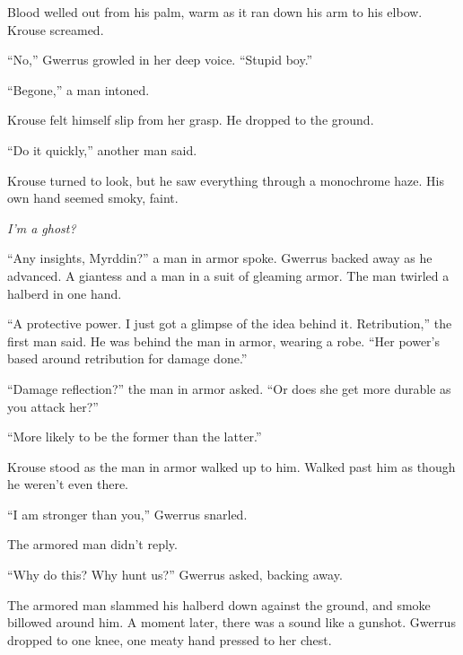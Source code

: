 Blood welled out from his palm, warm as it ran down his arm to his elbow.  Krouse screamed.



``No,'' Gwerrus growled in her deep voice.  ``Stupid boy.''



``Begone,'' a man intoned.



Krouse felt himself slip from her grasp.  He dropped to the ground.



``Do it quickly,'' another man said.



Krouse turned to look, but he saw everything through a monochrome haze.  His own hand seemed smoky, faint.



\emph{I'm a ghost?}



``Any insights, Myrddin?'' a man in armor spoke.  Gwerrus backed away as he advanced.  A giantess and a man in a suit of gleaming armor.  The man twirled a halberd in one hand.



``A protective power.  I just got a glimpse of the idea behind it.  Retribution,'' the first man said.  He was behind the man in armor, wearing a robe.  ``Her power's based around retribution for damage done.''



``Damage reflection?'' the man in armor asked.  ``Or does she get more durable as you attack her?''



``More likely to be the former than the latter.''



Krouse stood as the man in armor walked up to him.  Walked past him as though he weren't even there.



``I am stronger than you,'' Gwerrus snarled.



The armored man didn't reply.



``Why do this?  Why hunt us?''  Gwerrus asked, backing away.



The armored man slammed his halberd down against the ground, and smoke billowed around him.  A moment later, there was a sound like a gunshot.  Gwerrus dropped to one knee, one meaty hand pressed to her chest.



